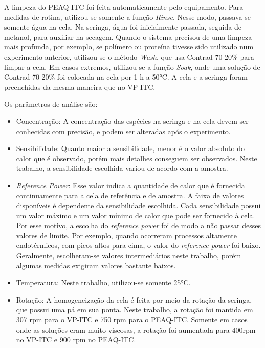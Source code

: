		A limpeza do PEAQ-ITC foi feita automaticamente pelo equipamento. Para medidas de rotina, utilizou-se somente a função \emph{Rinse}. Nesse modo, passava-se somente água na cela. Na seringa, água foi inicialmente passada, seguida de metanol, para auxiliar na secagem. Quando o sistema precisou de uma limpeza mais profunda, por exemplo, se polímero ou proteína tivesse sido utilizado num experimento anterior, utilizou-se o método \emph{Wash}, que usa Contrad 70 20\% para limpar a cela. Em casos extremos, utilizou-se a função \emph{Soak}, onde uma solução de Contrad 70 20\% foi colocada na cela por 1 h a 50°C. A cela e a seringa foram preenchidas da mesma maneira que no VP-ITC.
		
		Os parâmetros de análise são:
		
		\begin{itemize}[noitemsep]
			
			\item Concentração: A concentração das espécies na seringa e na cela devem ser conhecidas com precisão, e podem ser alteradas após o experimento.
			
			\item Sensibilidade: Quanto maior a sensibilidade, menor é o valor absoluto do calor que é observado, porém mais detalhes conseguem ser observados. Neste trabalho, a sensibilidade escolhida variou de acordo com a amostra.
			
			\item \emph{Reference Power}: Esse valor indica a quantidade de calor que é fornecida continuamente para a cela de referência e de amostra. A faixa de valores disponíveis é dependente da sensibilidade escolhida. Cada sensibilidade possui um valor máximo e um valor mínimo de calor que pode ser fornecido à cela. Por esse motivo, a escolha do \emph{reference power} foi de modo a não passar desses valores de limite. Por exemplo, quando ocorreram processos altamente endotérmicos, com picos altos para cima, o valor do \emph{reference power} foi baixo. Geralmente, escolheram-se valores intermediários neste trabalho, porém algumas medidas exigiram valores bastante baixos.
			
			\item Temperatura: Neste trabalho, utilizou-se somente 25°C.
				
			\item Rotação: A homogeneização da cela é feita por meio da rotação da seringa, que possui uma pá em sua ponta. Neste trabalho, a rotação foi mantida em 307 rpm para o VP-ITC e 750 rpm para o PEAQ-ITC. Somente em casos onde as soluções eram muito viscosas, a rotação foi aumentada para 400rpm no VP-ITC e 900 rpm no PEAQ-ITC.
			

\end{itemize}
